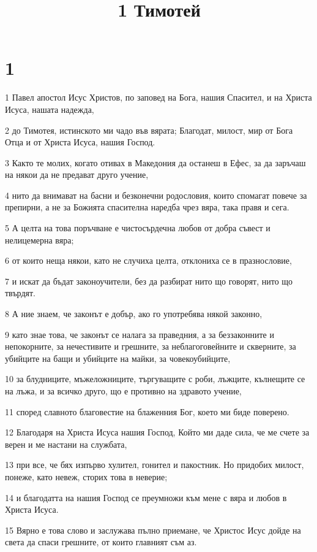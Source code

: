 

\title{1 Тимотей}


\chapter{1}

\par 1 Павел апостол Исус Христов, по заповед на Бога, нашия Спасител, и на Христа Исуса, нашата надежда,
\par 2 до Тимотея, истинското ми чадо във вярата; Благодат, милост, мир от Бога Отца и от Христа Исуса, нашия Господ.
\par 3 Както те молих, когато отивах в Македония да останеш в Ефес, за да заръчаш на някои да не предават друго учение,
\par 4 нито да внимават на басни и безконечни родословия, които спомагат повече за препирни, а не за Божията спасителна наредба чрез вяра, така правя и сега.
\par 5 А целта на това поръчване е чистосърдечна любов от добра съвест и нелицемерна вяра;
\par 6 от които неща някои, като не случиха целта, отклониха се в празнословие,
\par 7 и искат да бъдат законоучители, без да разбират нито що говорят, нито що твърдят.
\par 8 А ние знаем, че законът е добър, ако го употребява някой законно,
\par 9 като знае това, че законът се налага за праведния, а за беззаконните и непокорните, за нечестивите и грешните, за неблагоговейните и скверните, за убийците на бащи и убийците на майки, за човекоубийците,
\par 10 за блудниците, мъжеложниците, търгуващите с роби, лъжците, кълнещите се на лъжа, и за всичко друго, що е противно на здравото учение,
\par 11 според славното благовестие на блаженния Бог, което ми биде поверено.
\par 12 Благодаря на Христа Исуса нашия Господ, Който ми даде сила, че ме счете за верен и ме настани на службата,
\par 13 при все, че бях изпърво хулител, гонител и пакостник. Но придобих милост, понеже, като невеж, сторих това в неверие;
\par 14 и благодатта на нашия Господ се преумножи към мене с вяра и любов в Христа Исуса.
\par 15 Вярно е това слово и заслужава пълно приемане, че Христос Исус дойде на света да спаси грешните, от които главният съм аз.
